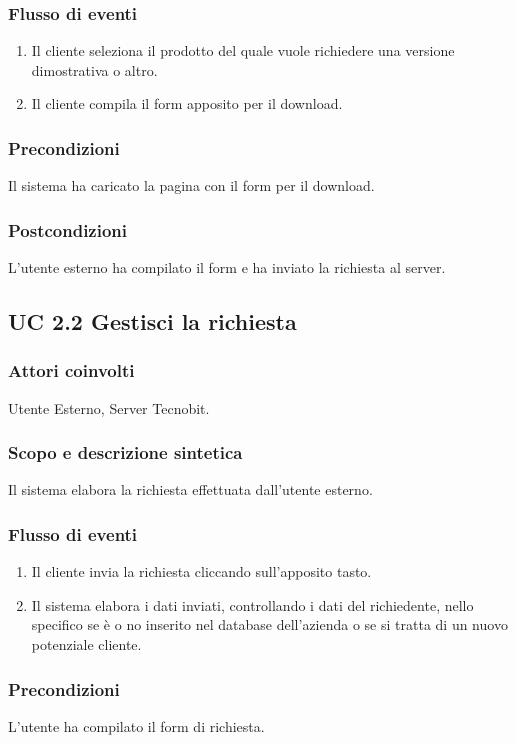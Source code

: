\subsubsection*{Flusso di eventi}
\begin{enumerate}
\item Il cliente seleziona il prodotto del quale vuole richiedere una versione dimostrativa o altro.
\item Il cliente compila il form apposito per il download.
\end{enumerate}
\subsubsection*{Precondizioni} Il sistema ha caricato la pagina con il form per il download.
\subsubsection*{Postcondizioni} L'utente esterno ha compilato il form e ha inviato la richiesta al server.

\subsection*{UC 2.2 Gestisci la richiesta}
\subsubsection*{Attori coinvolti} Utente Esterno, Server Tecnobit.
\subsubsection*{Scopo e descrizione sintetica}
Il sistema elabora la richiesta effettuata dall'utente esterno.
\subsubsection*{Flusso di eventi}
\begin{enumerate}
\item Il cliente invia la richiesta cliccando sull'apposito tasto.
\item Il sistema elabora i dati inviati, controllando i dati del richiedente, nello specifico se \`e o no inserito nel database dell'azienda o se si tratta di un nuovo potenziale cliente.
\end{enumerate}
\subsubsection*{Precondizioni} L'utente ha compilato il form di richiesta.
